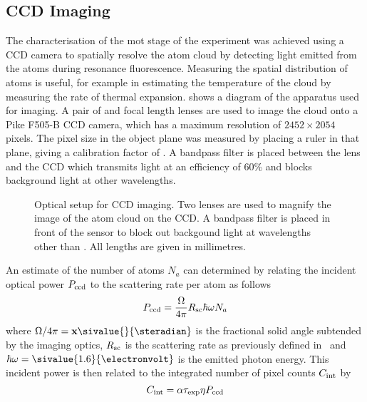\subsection{CCD Imaging}\label{sec:imaging}
The characterisation of the \ac{mot} stage of the experiment was achieved
using a CCD camera to spatially resolve the atom cloud by detecting light
emitted from the atoms during resonance fluorescence. Measuring the spatial
distribution of atoms is useful, for example in estimating the temperature of
the cloud by measuring the rate of thermal expansion.
 shows a diagram of the apparatus used for
imaging. A pair of  and 
focal length lenses are used to image the cloud onto a Pike F505-B CCD
camera, which has a maximum resolution of \(2452 \times 2054\) pixels. The
pixel size in the object plane was measured by placing a ruler in that plane,
giving a calibration factor of . A
bandpass filter is placed between the lens and the CCD which transmits
 light at an efficiency of 60\% and blocks
background light at other wavelengths. 
\begin{figure}
    \centering
    \def\svgwidth{
    0.6\textwidth}
    
    \caption[Optical setup for CCD imaging]{Optical setup for CCD imaging. Two lenses are used to magnify the image of
the atom cloud on the CCD. A bandpass filter is placed in front of the sensor
to block out backgound light at wavelengths other than
. All lengths are given in millimetres.}
    \label{fig:imaging_optics}
\end{figure}
\par\noindent
An estimate of the number of atoms \(N_a\) can determined by relating the
incident optical power \(P_\textnormal{ccd}\) to the scattering rate per atom
as follows
\begin{equation}
    P_\textnormal{ccd} = \frac{\Omega}{4\pi}  R_\textnormal{sc}  \hbar \omega N_a
\end{equation}
where $\Omega/4\pi = \textbf{x}\sivalue{}{\steradian}$ is the fractional
solid angle subtended by the imaging optics, \(R_\textnormal{sc}\) is the
scattering rate as previously defined in~ and
\(\hbar \omega = \sivalue{1.6}{\electronvolt}\) is the emitted photon energy.
This incident power is then related to the integrated number of pixel counts
\(C_\textnormal{int}\) by 
\begin{equation}
    C_\textnormal{int} = \alpha \tau_\textnormal{exp} \eta P_\textnormal{ccd}
\end{equation}
